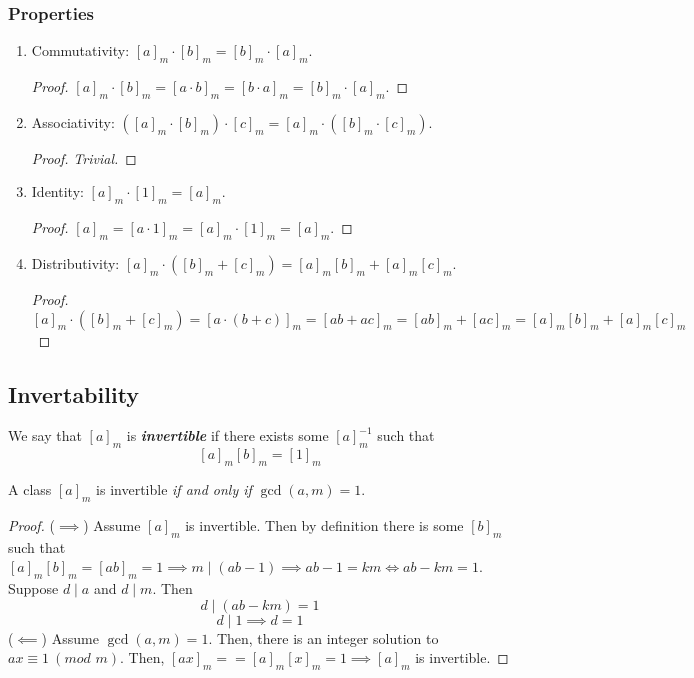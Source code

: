\documentclass{report}
\newcommand{\textib}[1]{\textit{\textbf{{#1}}}}
\newcommand{\theorem}[1]{\begin{tcolorbox}[title=\textit{Theorem}]{#1}\end{tcolorbox}}
\renewcommand{\mod}[1]{\ (\textit{mod } {#1})}
\begin{document}
\subsubsection{Properties}
\begin{enumerate}[label=\textit{(\roman*)}]
    \item Commutativity: $[a]_m \cdot [b]_m = [b]_m \cdot [a]_m$.
        \begin{proof}
            $[a]_m \cdot [b]_m = [a \cdot b]_m = [b \cdot a]_m = [b]_m \cdot [a]_m$.
        \end{proof}
    \item Associativity: $([a]_m \cdot [b]_m) \cdot [c]_m = [a]_m \cdot ([b]_m \cdot [c]_m)$.
        \begin{proof}
            \textit{Trivial.}
        \end{proof}
    \item Identity: $[a]_m \cdot [1]_m = [a]_m$.
        \begin{proof}
            $[a]_m = [a \cdot 1]_m = [a]_m \cdot [1]_m = [a]_m$.
        \end{proof}
    \item Distributivity: $[a]_m \cdot ([b]_m + [c]_m) = [a]_m[b]_m + [a]_m[c]_m$.
        \begin{proof}
            $[a]_m \cdot ([b]_m + [c]_m) = [a \cdot (b + c)]_m = [ab + ac]_m = [ab]_m + [ac]_m = [a]_m[b]_m + [a]_m[c]_m$
        \end{proof}
\end{enumerate}


\subsection{Invertability}
We say that $[a]_m$ is \textib{invertible} if there exists some $[a]_m^{-1}$ such that
\[[a]_m[b]_m = [1]_m\]

\theorem {
    A class $[a]_m$ is invertible \textit{if and only if} $\gcd(a, m) = 1$.
}
\begin{proof}
    ($\implies$) Assume $[a]_m$ is invertible. Then by definition there is some $[b]_m$ such that
    $[a]_m[b]_m = [ab]_m = 1 \implies m \mid (ab - 1) \implies ab - 1 = km \iff ab - km = 1$.
    Suppose $d \mid a$ and $d \mid m$. Then 
    \[d \mid (ab - km) = 1\]
    \[d \mid 1 \implies d = 1\]
    ($\impliedby$) Assume $\gcd(a, m) = 1$. Then, there is an integer solution to $ax \equiv 1 \mod{m}$.
    Then, $[ax]_m = = [a]_m[x]_m = 1 \implies [a]_m$ is invertible.
\end{proof}
\end{document}

